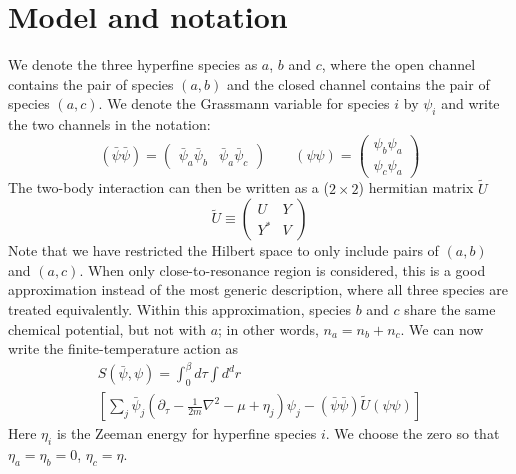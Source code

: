 \documentclass[reprint,pra]{revtex4-1}
\newcommand{\nth}[1]{\ensuremath{\frac{1}{#1}}}
\newcommand{\mbr}[1]{\ensuremath{\left[#1\right]}}
\newcommand{\mtrx}[1]{\ensuremath{\begin{pmatrix}#1\end{pmatrix}}}
\begin{document}
\section{Model and notation\label{sec:model}}
We denote the three hyperfine species as $a$, $b$ and $c$, where the open channel contains the pair of species $(a,b)$ and the closed channel contains the pair of species $(a,c)$.  We denote the Grassmann variable for species $i$ by $\psi_i$ and write the  two channels in the notation:
\begin{equation}
(\bar\psi\bar\psi)=\mtrx{\bar\psi_{a}\bar\psi_{b}&\bar\psi_{a}\bar\psi_{c}}
\qquad(\psi\psi)=\mtrx{\psi_{b}\psi_{a}\\\psi_{c}\psi_{a}}
\end{equation}
The two-body interaction can then be written as a ($2\times2$)  hermitian  matrix  $\tilde{U}$ 
\begin{equation}
\tilde{U}\equiv{}\mtrx{U&Y\\Y^{*}&V}
\end{equation}
 Note that we have restricted the Hilbert space to only include pairs of $(a,b)$ and $(a,c)$.  When only close-to-resonance region is considered, this is a good approximation instead of  the most generic description, where all three species are treated equivalently.  Within this approximation, species $b$ and $c$ share the same chemical potential, but not with $a$; in other words, $n_a=n_b+n_c$.  
  We can now write the finite-temperature action as 
\begin{multline}\label{eq:pathInt2:actionFermi}
S(\bar\psi,\psi)=\int^{\beta}_{0}d\tau\int{d^{d}r}\\
\mbr{\sum_{j}\bar\psi_{j}(\partial_\tau-\nth{2m}\nabla^{2}-\mu+\eta_{j})\psi_{j}
-(\bar\psi\bar\psi)\tilde{U}(\psi\psi)}
\end{multline}
Here $\eta_{i}$ is the Zeeman energy for hyperfine species $i$. We choose the zero so that $\eta_{a}=\eta_{b}=0$, $\eta_{c}=\eta$.    
\end{document}
